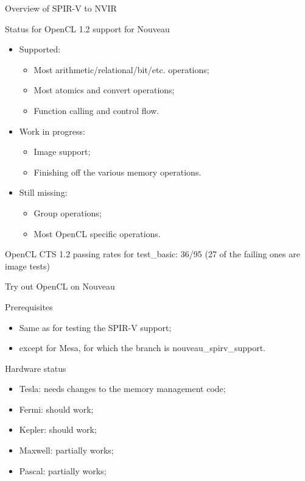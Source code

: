 \documentclass[11pt,english,compress]{beamer}
\begin{document}
\begin{frame}{Overview of SPIR-V to NVIR}
	\begin{block}{Status for OpenCL 1.2 support for Nouveau}
		\begin{itemize}
			\item Supported:
			\begin{itemize}
				\item Most arithmetic/relational/bit/etc. operations;
				\item Most atomics and convert operations;
				\item Function calling and control flow.
			\end{itemize}
			\item Work in progress:
			\begin{itemize}
				\item Image support;
				\item Finishing off the various memory operations.
			\end{itemize}
			\item Still missing:
			\begin{itemize}
				\item Group operations;
				\item Most OpenCL specific operations.
			\end{itemize}
		\end{itemize}

		OpenCL CTS 1.2 passing rates for test\_basic: 36/95 (27 of the
		failing ones are image tests)
	\end{block}
\end{frame}

\begin{frame}{Try out OpenCL on Nouveau}
	\begin{block}{Prerequisites}
		\begin{itemize}
			\item Same as for testing the SPIR-V support;
			\item except for Mesa, for which the branch is
				nouveau\_spirv\_support.
		\end{itemize}
	\end{block}
	\begin{block}{Hardware status}
		\begin{itemize}
			\item Tesla: needs changes to the memory management
				code;
			\item Fermi: should work;
			\item Kepler: should work;
			\item Maxwell: partially works;
			\item Pascal: partially works;
		\end{itemize}
	\end{block}
\end{frame}
\end{document}

